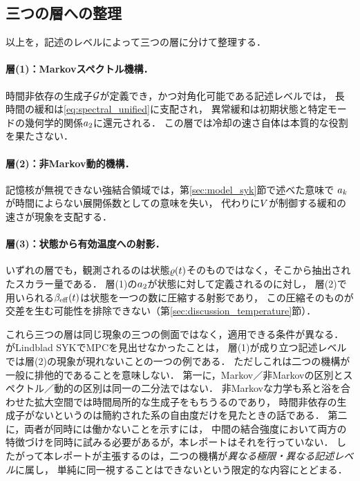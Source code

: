 \documentclass[a4paper,11pt,onecolumn,baselineskip=14.5pt]{jlreq}
\begin{document}
\subsection{三つの層への整理}
\label{sec:results_synthesis}

以上を，記述のレベルによって三つの層に分けて整理する．

\paragraph{層(1)：Markovスペクトル機構．}
時間非依存の生成子$\mathcal{G}$が定義でき，かつ対角化可能である記述レベルでは，
長時間の緩和は\eqref{eq:spectral_unified}に支配され，
異常緩和は初期状態と特定モードの幾何学的関係$a_{2}$に還元される．
この層では冷却の速さ自体は本質的な役割を果たさない．

\paragraph{層(2)：非Markov動的機構．}
記憶核が無視できない強結合領域では，第\ref{sec:model_syk}節で述べた意味で
$a_{k}$が時間によらない展開係数としての意味を失い，
代わりに$V$が制御する緩和の速さが現象を支配する．

\paragraph{層(3)：状態から有効温度への射影．}
いずれの層でも，観測されるのは状態$\varrho(t)$そのものではなく，そこから抽出されたスカラー量である．
層(1)の$a_{2}$が状態に対して定義されるのに対し，
層(2)で用いられる$\beta_{\mathrm{eff}}(t)$は状態を一つの数に圧縮する射影であり，
この圧縮そのものが交差を生む可能性を排除できない（第\ref{sec:discussion_temperature}節）．

これら三つの層は同じ現象の三つの側面ではなく，適用できる条件が異なる．
\cite{Wang2024}がLindblad SYKでMPCを見出せなかったことは，
層(1)が成り立つ記述レベルでは層(2)の現象が現れないことの一つの例である．
ただしこれは二つの機構が一般に排他的であることを意味しない．
第一に，Markov／非Markovの区別とスペクトル／動的の区別は同一の二分法ではない．
非Markovな力学も系と浴を合わせた拡大空間では時間局所的な生成子をもちうるのであり，
時間非依存の生成子がないというのは簡約された系の自由度だけを見たときの話である．
第二に，両者が同時には働かないことを示すには，
中間の結合強度において両方の特徴づけを同時に試みる必要があるが，本レポートはそれを行っていない．
したがって本レポートが主張するのは，二つの機構が\emph{異なる極限・異なる記述レベル}に属し，
単純に同一視することはできないという限定的な内容にとどまる．
\end{document}
